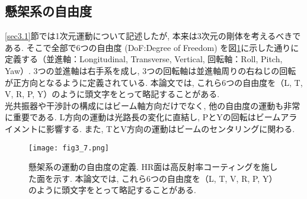 \subsection{懸架系の自由度}
\ref{sec3.1}節では1次元運動について記述したが, 本来は3次元の剛体を考えるべきである. そこで全部で6つの自由度 (DoF:Degree of Freedom) を図\ref{fig3.7}に示した通りに定義する（並進軸：Longitudinal, Transverse, Vertical, 回転軸：Roll, Pitch, Yaw）. 3つの並進軸は右手系を成し, 3つの回転軸は並進軸周りの右ねじの回転が正方向となるように定義されている. 本論文では, これら6つの自由度を（L, T, V, R, P, Y）のように頭文字をとって略記することがある. \\
\quad 光共振器や干渉計の構成にはビーム軸方向だけでなく, 他の自由度の運動も非常に重要である. L方向の運動は光路長の変化に直結し, PとYの回転はビームアライメントに影響する. また, TとV方向の運動はビームのセンタリングに関わる. 
\begin{figure}[H]
\begin{center}
\texttt{[image: fig3\_7.png]}
\caption[懸架系の運動の自由度]{懸架系の運動の自由度の定義. HR面は高反射率コーティングを施した面を示す. 本論文では, これら6つの自由度を（L, T, V, R, P, Y）のように頭文字をとって略記することがある. }
\label{fig3.7}
\end{center}
\end{figure}